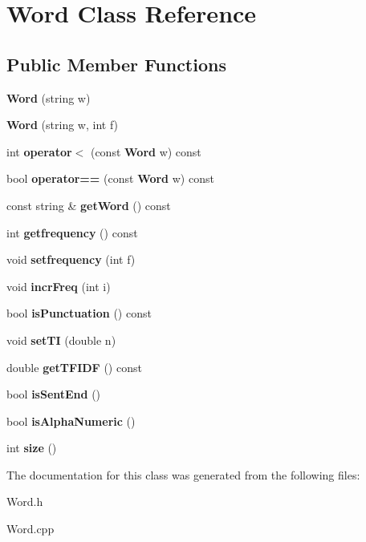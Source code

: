 \section{Word Class Reference}
\label{class_word}
\subsection*{Public Member Functions}
\begin{DoxyCompactItemize}
\item 
\mbox{\label{class_word_a40cbc368f30e9a1b813546c0e6a78726}} 
{\bfseries Word} (string w)
\item 
\mbox{\label{class_word_a5f1bc60bed011a078acc9bade47de095}} 
{\bfseries Word} (string w, int f)
\item 
\mbox{\label{class_word_ab6a8801486835d4da87a9af7d486167a}} 
int {\bfseries operator$<$} (const \textbf{ Word} w) const
\item 
\mbox{\label{class_word_aa5b9a45b0482b005e08e1a432c9679ad}} 
bool {\bfseries operator==} (const \textbf{ Word} w) const
\item 
\mbox{\label{class_word_ad86d8439e51c1576d7e7643145cade65}} 
const string \& {\bfseries get\+Word} () const
\item 
\mbox{\label{class_word_a42c52df4be68ee2f1a1885e0272efea8}} 
int {\bfseries getfrequency} () const
\item 
\mbox{\label{class_word_a10b7e506fe5f9d94cc59f4721a621e4b}} 
void {\bfseries setfrequency} (int f)
\item 
\mbox{\label{class_word_ac966de2a1a5745fd4b0fe661ac508cd9}} 
void {\bfseries incr\+Freq} (int i)
\item 
\mbox{\label{class_word_af564e9ebc1f99a7578242fe788dc2cea}} 
bool {\bfseries is\+Punctuation} () const
\item 
\mbox{\label{class_word_acf60467964912dc94b521b9694567c2c}} 
void {\bfseries set\+TI} (double n)
\item 
\mbox{\label{class_word_acd199e6b416879141272018433b2ee0b}} 
double {\bfseries get\+T\+F\+I\+DF} () const
\item 
\mbox{\label{class_word_a896978a25af0e2c9bd3e56fb2642d505}} 
bool {\bfseries is\+Sent\+End} ()
\item 
\mbox{\label{class_word_a465c7fe4176e903a2cd1dc6faf87ab1d}} 
bool {\bfseries is\+Alpha\+Numeric} ()
\item 
\mbox{\label{class_word_ad1c6277e946e0e4b8b76cc8410adb7ee}} 
int {\bfseries size} ()
\end{DoxyCompactItemize}


The documentation for this class was generated from the following files\+:\begin{DoxyCompactItemize}
\item 
Word.\+h\item 
Word.\+cpp\end{DoxyCompactItemize}
